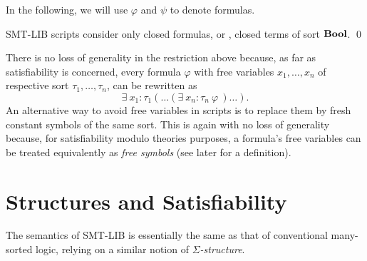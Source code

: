 In the following, we will use $\varphi$ and $\psi$ to denote formulas.
\medskip

\begin{constraint}
SMT-LIB scripts consider only closed formulas,
or , closed terms of sort $\textbf{Bool}$.
\qed
\end{constraint}

There is no loss of generality in the restriction above because,
as far as satisfiability is concerned,
every formula $\varphi$ with free variables 
$x_1, \ldots, x_n$ of respective sort $\tau_1, \ldots, \tau_n$,
can be rewritten as 
\[
 \exists\: x_1{:}\tau_1 ( \ldots (\exists\:x_n{:}\tau_n\: \varphi\ )\ldots).
\]
An alternative way to avoid free variables in scripts is 
to replace them by fresh constant symbols of the same sort.
This is again with no loss of generality because,
for satisfiability modulo theories purposes,
a formula's free variables can be treated equivalently as 
\emph{free symbols} (see later for a definition).


\section{Structures and Satisfiability} \label{sec:models}

The semantics of SMT-LIB is essentially the same as that 
of conventional many-sorted logic,
relying on a similar notion of \emph{$\Sigma$-structure}.


